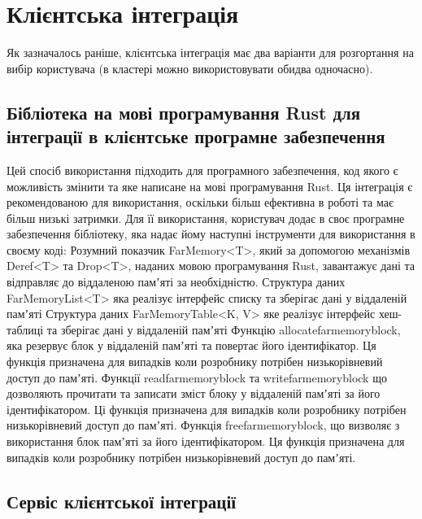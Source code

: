 \section {Клієнтська інтеграція}

Як зазначалось раніше, клієнтська інтеграція має два варіанти для розгортання на вибір користувача (в кластері можно використовувати обидва одночасно).

\subsection{Бібліотека на мові програмування Rust для інтеграції в клієнтське програмне забезпечення}

Цей спосіб використання підходить для програмного забезпечення, код якого є можливість змінити та яке написане на мові програмування Rust. Ця інтеграція є рекомендованою для використання, оскільки більш ефективна в роботі та має більш низькі затримки.
	Для її використання, користувач додає в своє програмне забезпечення бібліотеку, яка надає йому наступні інструменти для використання в своєму коді:
Розумний показчик FarMemory<T>, який за допомогою механізмів Deref<T> та Drop<T>, наданих мовою програмування Rust, завантажує дані та відправляє до віддаленою памʼяті за необхідністю.
Структура даних FarMemoryList<T> яка реалізує інтерфейс списку та зберігає дані у віддаленій памʼяті
Структура даних FarMemoryTable<K, V> яке реалізує інтерфейс хеш-таблиці та зберігає дані у віддаленій памʼяті
Функцію allocate\textunderscore far\textunderscore memory\textunderscore block, яка резервує блок у віддаленій памʼяті та повертає його ідентифікатор. Ця функція призначена для випадків коли розробнику потрібен низькорівневий доступ до памʼяті.
Функції read\textunderscore far\textunderscore memory\textunderscore block та write\textunderscore far\textunderscore memory\textunderscore block що дозволяють прочитати та записати зміст блоку у віддаленій памʼяті за його ідентифікатором. Ці функція призначена для випадків коли розробнику потрібен низькорівневий доступ до памʼяті.
Функція free\textunderscore far\textunderscore memory\textunderscore block, що визволяє з використання блок памʼяті за його ідентифікатором. Ця функція призначена для випадків коли розробнику потрібен низькорівневий доступ до памʼяті.

\subsection {Сервіс клієнтської інтеграції}

